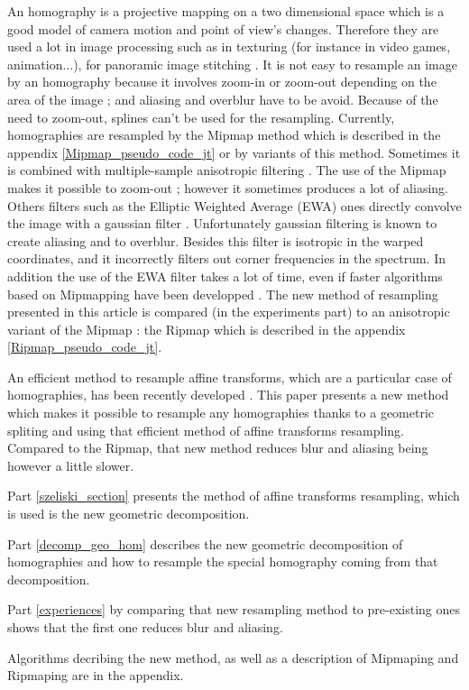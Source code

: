 
An homography is a projective mapping on a two dimensional space which is a good model of camera motion and point of view's changes. Therefore they are used a lot in image processing such as in texturing \cite{heckbert1983texture} (for instance in video games, animation...), for panoramic image stitching \cite{brown2007automatic}. It is not easy to resample an image by an homography because it involves zoom-in or zoom-out depending on the area of the image ; and aliasing and overblur have to be avoid. Because of the need to zoom-out, splines can't be used for the resampling. Currently, homographies are resampled by the Mipmap method \cite{williams1983pyramidal} which is described in the appendix \ref{Mipmap_pseudo_code_jt} or by variants of this method. Sometimes it is combined with multiple-sample anisotropic filtering  \cite{barkans1997high}. The use of the Mipmap makes it possible to zoom-out ; however it sometimes produces a lot of aliasing. Others filters such as the Elliptic Weighted Average (EWA) ones directly convolve the image with a gaussian filter \cite{greene1986creating}. Unfortunately gaussian filtering is known to create aliasing and to overblur. Besides this filter is isotropic in the warped coordinates, and it incorrectly filters out corner frequencies in the spectrum. In addition the use of the EWA filter takes a lot of time, even if faster algorithms based on Mipmapping have been developped \cite{mccormack1999feline,huttner1999fast}. The new method of resampling presented in this article is compared (in the experiments part) to an anisotropic variant of the Mipmap : the Ripmap \cite{akenine2008real} which is described in the appendix \ref{Ripmap_pseudo_code_jt}.

	An efficient method to resample affine transforms, which are a particular case of homographies, has been recently developed \cite{szeliski2010high}. This paper presents a new method which makes it possible to resample any homographies thanks to a geometric spliting and using that efficient method of affine transforms resampling. Compared to the Ripmap, that new method reduces blur and aliasing being however a little slower. 
	
	Part \ref{szeliski_section} presents the method of affine transforms resampling, which is used is the new geometric decomposition.
	
	Part \ref{decomp_geo_hom} describes the new geometric decomposition of homographies and how to resample the special homography coming from that decomposition.
	
	Part \ref{experiences} by comparing that new resampling method to pre-existing ones shows that the first one reduces blur and aliasing.
	
	Algorithms decribing the new method, as well as a description of Mipmaping and Ripmaping are in the appendix.
	
